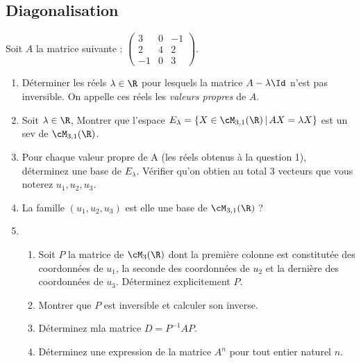 \subsection{Diagonalisation}





\begin{exercice}
Soit $A$ la matrice suivante : 
$\left(\begin{array}{ccc}
3&0&-1\\
2&4&2\\
-1&0&3
\end{array}
\right).$
\begin{enumerate}
\item Déterminer les réels $\lambda\in \R$ pour lesquels la matrice $A-\lambda \Id$ n'est pas  inversible. On appelle ces réels les \emph{valeurs propres} de $A$. 
\item Soit $\lambda\in \R$, Montrer que l'espace 
$E_\lambda =\{ X\in \cM_{3,1}(\R) \, |\, AX=\lambda X\}$ est un sev de $\cM_{3,1}(\R)$.
\item Pour chaque valeur propre de A  (les réels obtenus à la question 1), déterminez une base de $E_\lambda$. Vérifier qu'on obtien au total 3 vecteurs que vous noterez $u_1,u_2,u_3$. 
\item La famille $(u_1,u_2,u_3)$ est elle une base de $\cM_{3,1}(\R)$ ? 
\item \begin{enumerate}
\item Soit $P$ la matrice de $\cM_3(\R) $ dont la première colonne est constitutée des coordonnées de $u_1$, la seconde des coordonnées de $u_2$ et  la dernière des coordonnées de $u_3$. Déterminez explicitement $P$. 
\item Montrer que $P$ est inversible et calculer son inverse. 
\item Déterminez mla matrice $D=P^{-1} AP$. 
\item Déterminez une expression de la matrice $A^n$ pour tout entier naturel $n$. 
\end{enumerate}
\end{enumerate}
\end{exercice}

